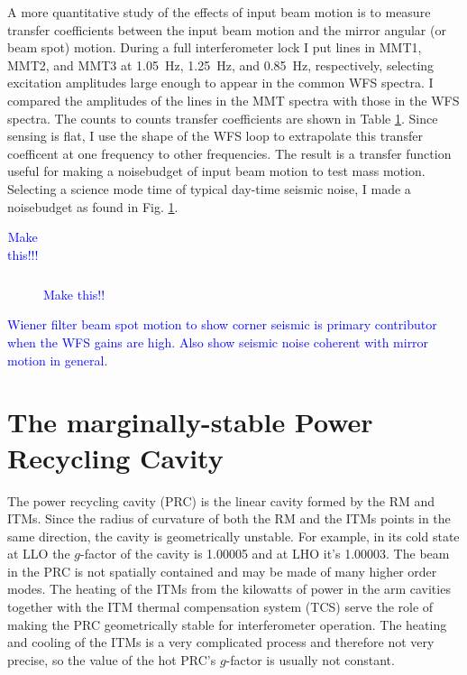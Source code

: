 A more quantitative study of the effects of input beam motion is to
measure transfer coefficients between the input beam motion and the
mirror angular (or beam spot) motion. During a full interferometer
lock I put lines in MMT1, MMT2, and MMT3 at 1.05~Hz, 1.25~Hz, and
0.85~Hz, respectively, selecting excitation amplitudes large enough to
appear in the common WFS spectra. I compared the amplitudes of the
lines in the MMT spectra with those in the WFS spectra. The counts to
counts transfer coefficients are shown in Table
\ref{table:inputbeam_TFcoeffs}. Since sensing is flat, I use the shape
of the WFS loop to extrapolate this transfer coefficent at one
frequency to other frequencies. The result is a transfer function
useful for making a noisebudget of input beam motion to test mass
motion. Selecting a science mode time of typical day-time seismic
noise, I made a noisebudget as found in Fig. \ref{fig:inputbeam_NB}.

\begin{table}
\centering
\caption{\textcolor{blue}{Make this!!!}}
\begin{tabular}{l l l l l l}
\hline
\end{tabular}
\label{table:inputbeam_TFcoeffs}
\end{table}


\begin{figure}
\begin{centering}
\caption{\textcolor{blue}{Make this!!}}
\label{fig:inputbeam_NB}
\end{centering}
\end{figure}


\textcolor{blue}{Wiener filter beam spot motion to show corner seismic is primary
contributor when the WFS gains are high. Also show seismic noise 
coherent with mirror motion in general.}



\section{The marginally-stable Power Recycling Cavity}
The power recycling cavity (PRC) is the linear cavity formed by the RM
and ITMs. Since the radius of curvature of both the RM and the ITMs
points in the same direction, the cavity is geometrically
unstable. For example, in its cold state at LLO the $g$-factor of the
cavity is 1.00005 and at LHO it's 1.00003. The beam in the PRC is not
spatially contained and may be made of many higher order modes. The
heating of the ITMs from the kilowatts of power in the arm cavities
together with the ITM thermal compensation system (TCS) serve the role
of making the PRC geometrically stable for interferometer
operation. The heating and cooling of the ITMs is a very complicated
process and therefore not very precise, so the value of the hot PRC's
$g$-factor is usually not constant.

